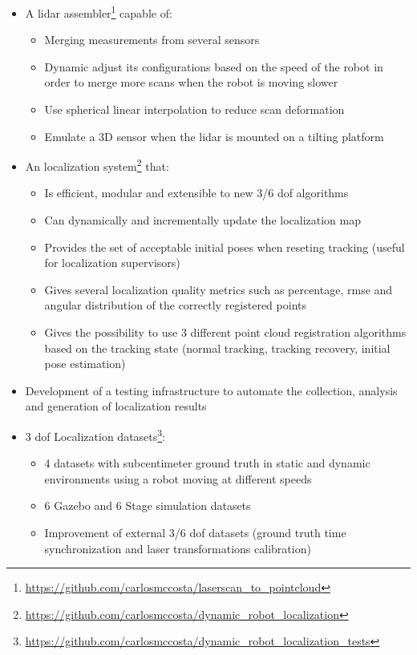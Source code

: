 \begin{itemize}
	\item A \gls{lidar} assembler\footnote{\url{https://github.com/carlosmccosta/laserscan_to_pointcloud}} capable of:
	\begin{itemize}
		\item Merging measurements from several sensors
		\item Dynamic adjust its configurations based on the speed of the robot in order to merge more scans when the robot is moving slower
		\item Use spherical linear interpolation to reduce scan deformation
		\item Emulate a 3D sensor when the \gls{lidar} is mounted on a tilting platform
	\end{itemize}

	\item An localization system\footnote{\url{https://github.com/carlosmccosta/dynamic_robot_localization}} that:
	\begin{itemize}
		\item Is efficient, modular and extensible to new 3/6 \gls{dof} algorithms
		\item Can dynamically and incrementally update the localization map
		\item Provides the set of acceptable initial poses when reseting tracking (useful for localization supervisors)
		\item Gives several localization quality metrics such as percentage, \gls{rmse} and angular distribution of the correctly registered points
		\item Gives the possibility to use 3 different point cloud registration algorithms based on the tracking state (normal tracking, tracking recovery, initial pose estimation)
	\end{itemize}

	\item Development of a testing infrastructure to automate the collection, analysis and generation of localization results

	\item 3 \gls{dof} Localization datasets\footnote{\url{https://github.com/carlosmccosta/dynamic_robot_localization_tests}}:
	\begin{itemize}
		\item 4 datasets with subcentimeter ground truth in static and dynamic environments using a robot moving at different speeds
		\item 6 Gazebo and 6 Stage simulation datasets
		\item Improvement of external 3/6 \gls{dof} datasets (ground truth time synchronization and laser transformations calibration)
	\end{itemize}


\end{itemize}
